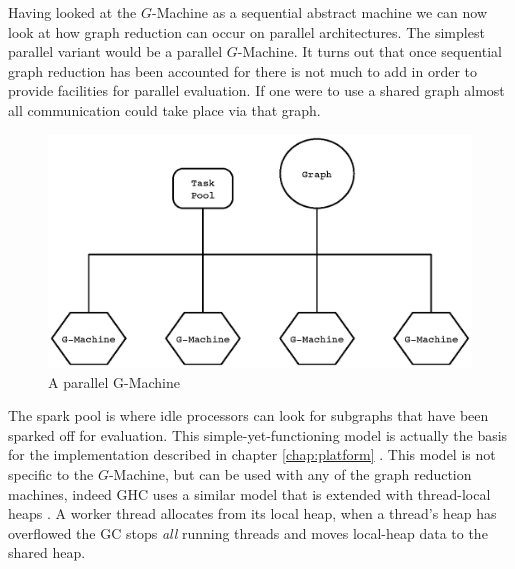     Having looked at the $G$-Machine as a sequential abstract machine we can now
look at how graph reduction can occur on parallel architectures. The simplest
parallel variant would be a parallel $G$-Machine. It turns out that once
sequential graph reduction has been accounted for there is not much to add in
order to provide facilities for parallel evaluation. If one were to use a shared
graph almost all communication could take place via that graph.

\begin{figure}[h]
  \centering
  \includegraphics[scale=0.7]{Background/figures/simpleParallel.eps}
  \caption[Simple parallel graph reduction model]
   {A parallel G-Machine}
    \label{fig:simpleGMachine}
\end{figure}

The spark pool is where idle processors can look for subgraphs that have been
sparked off for evaluation. This simple-yet-functioning model is actually the
basis for the implementation described in chapter \ref{chap:platform}
\citep{PeytonJones:IFL}. This model is not specific to the $G$-Machine, but can
be used with any of the graph reduction machines, indeed GHC uses a similar
model that is extended with thread-local heaps \citep{marlow2009runtime}. A
worker thread allocates from its local heap, when a thread's heap has
overflowed the GC stops \emph{all} running threads and moves local-heap data to
the shared heap.


